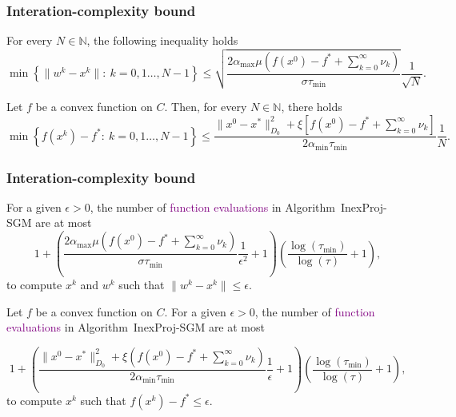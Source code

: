 \begin{frame}[t]\frametitle{Interation-complexity bound}
  \begin{theorem}[3.13]
    For every $N \in \mathbb{N}$, the following inequality holds
    $$
      \min\left\{\|w^k-x^k\| :~ k= 0, 1 \ldots, N-1\right\} \leq \sqrt{\frac{2{\alpha_{\max}}\mu\left(f(x^0)-f^* +\sum_{k= 0}^{\infty}\nu_k\right) }{\sigma \tau_{\min}}} \frac{1}{\sqrt{N}}.
    $$
  \end{theorem}


  \bigskip\bigskip



  \begin{theorem}[3.17]
    Let $f$ be a convex function on $C$. Then, for every $N \in \mathbb{N}$, there holds
    $$
      \min \left\{f(x^k) - f^* :~k = 0, 1 \ldots, N-1\right\} \leq \frac{\|x^0 - x^*\|^2_{D_0} + \xi\left[f(x^0)-f^*+ \sum_{k=0}^{\infty} \nu_k\right]}{2 \alpha_{\min} \tau_{\min}}\frac{1}{N}.
    $$
  \end{theorem}
\end{frame}



\begin{frame}[c]\frametitle{Interation-complexity bound}
  \begin{theorem}[3.15]
    For a given $\epsilon>0$, the number  of  \textcolor{purple}{function evaluations} in  Algorithm~InexProj-SGM are  at most
    $$
      1+\left({\frac{2{\alpha_{\max}}\mu\left(f(x^0)-f^* +\sum_{k= 0}^{\infty}\nu_k\right) }{\sigma \tau_{\min}}} \frac{1}{\epsilon^2}+1\right) \left(\frac{\log (\tau_{\min})}{\log (\tau)}+1\right),
    $$
    to compute $x^k$ and $w^k$ such that $\|  w^{k}-x^{k}\|\leq \epsilon$.
  \end{theorem}

  \bigskip\bigskip


  \begin{theorem}[3.16]
    Let $f$ be a convex function on $C$. For a given $\epsilon>0$, the number  of  \textcolor{purple}{function evaluations} in  Algorithm~InexProj-SGM are  at most

    $$
      1+\left(\frac{\|x^0 - x^*\|^2_{D_0} + \xi\left(f(x^0)-f^*+ \sum_{k=0}^{\infty} \nu_k\right)}{2 \alpha_{\min} \tau_{\min}}\frac{1}{\epsilon}+1\right) \left(\frac{\log (\tau_{\min})}{\log (\tau)}+1\right),
    $$
    to compute $x^k$ such that $f(x^k) - f^*\leq \epsilon$.
  \end{theorem}
\end{frame}